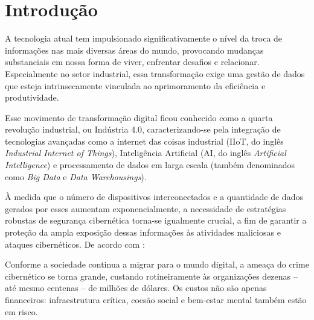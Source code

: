 

\chapter[Introdução]{Introdução} \label{cap:introducao}

    A tecnologia atual tem impulsionado significativamente o nível da troca de informações nas mais diversas áreas do mundo, provocando mudanças substanciais em nossa forma de viver, enfrentar desafios e relacionar. Especialmente no setor industrial, essa transformação exige uma gestão de dados que esteja intrinsecamente vinculada ao aprimoramento da eficiência e produtividade.
    
    Esse movimento de transformação digital ficou conhecido como a quarta revolução industrial, ou Indústria 4.0, caracterizando-se pela integração de tecnologias avançadas como a internet das coisas industrial (IIoT, do inglês \textit{Industrial Internet of Things}), Inteligência Artificial (AI, do inglês \textit{Artificial Intelligence}) e processamento de dados em larga escala (também denominados como \textit{Big Data} e \textit{Data Warehousings}).
    
    À medida que o número de dispositivos interconectados e a quantidade de dados gerados por esses aumentam exponencialmente, a necessidade de estratégias robustas de segurança cibernética torna-se igualmente crucial, a fim de garantir a proteção da ampla exposição dessas informações às atividades maliciosas e ataques cibernéticos. De acordo com :
    
    \begin{citacao}
        Conforme a sociedade continua a migrar para o mundo digital, a ameaça do crime cibernético se torna grande, custando rotineiramente às organizações dezenas – até mesmo centenas – de milhões de dólares. Os custos não são apenas financeiros: infraestrutura crítica, coesão social e bem-estar mental também estão em risco.
    \end{citacao}


